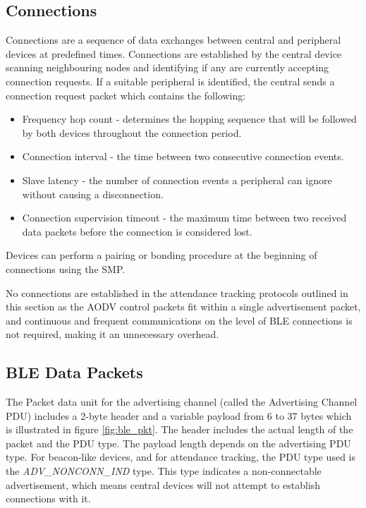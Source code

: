       \subsection{Connections}
    Connections are a sequence of data exchanges between central and peripheral
    devices at predefined times. Connections are established by the central
    device scanning neighbouring nodes and identifying if any are currently
    accepting connection requests. If a suitable peripheral is identified, the
    central sends a connection request packet which contains the following:
    \begin{itemize}
      \item Frequency hop count - determines the hopping sequence that will be followed
      by both devices throughout the connection period.
      \item Connection interval - the time between two consecutive connection
      events.
      \item Slave latency - the number of connection events a peripheral can ignore
      without causing a disconnection.
      \item Connection supervision timeout - the maximum time between two received
      data packets before the connection is considered lost.
    \end{itemize}

    Devices can perform a pairing or bonding procedure at the beginning of connections
    using the SMP.

    No connections are established in the attendance tracking protocols outlined in
    this section as the AODV control packets fit within a single advertisement
    packet, and continuous and frequent communications on the level of BLE connections
    is not required, making it an unnecessary overhead.

      \subsection{BLE Data Packets}
    The Packet data unit for the advertising channel (called the Advertising
    Channel PDU) includes a 2-byte header and a variable payload from 6 to 37
    bytes which is illustrated in figure \ref{fig:ble_pkt}. The header includes the actual
    length of the packet and the PDU type. The payload length depends on the
    advertising PDU type. For beacon-like devices, and for attendance tracking,
    the PDU type used is the \textit{ADV\_NONCONN\_IND} type. This type indicates
    a non-connectable advertisement, which means central devices will not attempt
    to establish connections with it.

